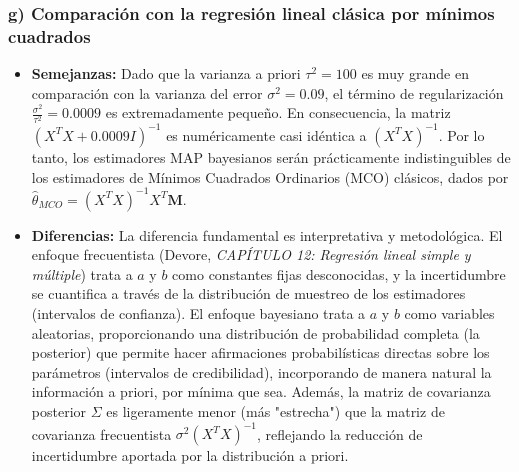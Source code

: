 \documentclass[12pt]{article}
\begin{document}
\subsubsection*{g) Comparación con la regresión lineal clásica por mínimos cuadrados}
\begin{itemize}
    \item \textbf{Semejanzas:} Dado que la varianza a priori $\tau^2 = 100$ es muy grande en comparación con la varianza del error $\sigma^2 = 0.09$, el término de regularización $\frac{\sigma^2}{\tau^2} = 0.0009$ es extremadamente pequeño. En consecuencia, la matriz $\left( X^T X + 0.0009 I \right)^{-1}$ es numéricamente casi idéntica a $(X^T X)^{-1}$. Por lo tanto, los estimadores MAP bayesianos serán prácticamente indistinguibles de los estimadores de Mínimos Cuadrados Ordinarios (MCO) clásicos, dados por $\hat{\theta}_{MCO} = (X^T X)^{-1} X^T \mathbf{M}$.
    \item \textbf{Diferencias:} La diferencia fundamental es interpretativa y metodológica. El enfoque frecuentista (Devore, \textit{CAPÍTULO 12: Regresión lineal simple y múltiple}) trata a $a$ y $b$ como constantes fijas desconocidas, y la incertidumbre se cuantifica a través de la distribución de muestreo de los estimadores (intervalos de confianza). El enfoque bayesiano trata a $a$ y $b$ como variables aleatorias, proporcionando una distribución de probabilidad completa (la posterior) que permite hacer afirmaciones probabilísticas directas sobre los parámetros (intervalos de credibilidad), incorporando de manera natural la información a priori, por mínima que sea. Además, la matriz de covarianza posterior $\Sigma$ es ligeramente menor (más "estrecha") que la matriz de covarianza frecuentista $\sigma^2 (X^T X)^{-1}$, reflejando la reducción de incertidumbre aportada por la distribución a priori.
\end{itemize}
\end{document}
